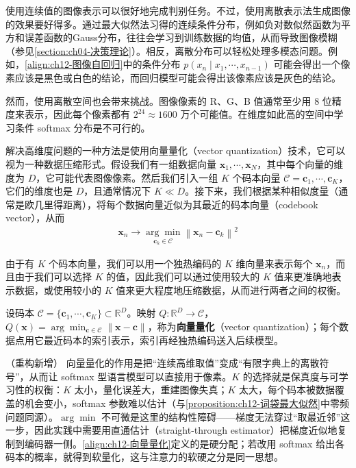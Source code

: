 \documentclass[../../main.tex]{subfiles}
\begin{document}
使用连续值的图像表示可以很好地完成判别任务。不过，使用离散表示法生成图像的效果要好得多。通过最大似然法习得的连续条件分布，例如负对数似然函数为平方和误差函数的Gauss分布，往往会学习到训练数据的均值，从而导致图像模糊（参见\cref{section:ch04-决策理论}）。相反，离散分布可以轻松处理多模态问题。例如，\eqref{align:ch12-图像自回归}中的条件分布 $p(x_n\mid x_1,\cdots,x_{n-1})$ 可能会得出一个像素应该是黑色或白色的结论，而回归模型可能会得出该像素应该是灰色的结论。

然而，使用离散空间也会带来挑战。图像像素的 R、G、B 值通常至少用 8 位精度来表示，因此每个像素都有 $2^{24}\approx1600$ 万个可能值。在维度如此高的空间中学习条件 softmax 分布是不可行的。

解决高维度问题的一种方法是使用向量量化（vector quantization）技术，它可以视为一种数据压缩形式。假设我们有一组数据向量 $\mathbf{x}_1,\cdots,\mathbf{x}_N$，其中每个向量的维度为 $D$，它可能代表图像像素。然后我们引入一组 $K$ 个码本向量 $\mathcal{C}=\mathbf{c}_1,\cdots,\mathbf{c}_K$，它们的维度也是 $D$，且通常情况下 $K\ll D$。接下来，我们根据某种相似度量（通常是欧几里得距离），将每个数据向量近似为其最近的码本向量（codebook vector），从而
\begin{align}
\mathbf{x}_n\to\underset{\mathbf{c}_k\in\mathcal{C}}{\arg\min}\left\|\mathbf{x}_n-\mathbf{c}_k\right\|^{2}
\label{align:ch12-向量量化}
\end{align}

由于有 $K$ 个码本向量，我们可以用一个独热编码的 $K$ 维向量来表示每个 $\mathbf{x}_n$，而且由于我们可以选择 $K$ 的值，因此我们可以通过使用较大的 $K$ 值来更准确地表示数据，或使用较小的 $K$ 值来更大程度地压缩数据，从而进行两者之间的权衡。

\begin{definition}[向量量化]\label{definition:ch12-向量量化}
设码本 $\mathcal{C}=\{\mathbf{c}_1,\cdots,\mathbf{c}_K\}\subset\mathbb{R}^{D}$。映射 $Q:\mathbb{R}^{D}\to\mathcal{C}$，$Q(\mathbf{x})=\arg\min_{\mathbf{c}\in\mathcal{C}}\|\mathbf{x}-\mathbf{c}\|$，称为\textbf{向量量化}（vector quantization）；每个数据点用它最近码本的索引表示，索引再经独热编码送入后续模型。
\end{definition}

\begin{remark}（重构新增）
向量量化的作用是把“连续高维取值”变成“有限字典上的离散符号”，从而让 softmax 型语言模型可以直接用于像素。$K$ 的选择就是保真度与可学习性的权衡：$K$ 太小，量化误差大，重建图像失真；$K$ 太大，每个码本被数据覆盖的机会变小，softmax 参数难以估计（与\cref{proposition:ch12-词袋最大似然}中零频问题同源）。$\arg\min$ 不可微是这里的结构性障碍——梯度无法穿过“取最近邻”这一步，因此实践中需要用直通估计（straight-through estimator）把梯度近似地复制到编码器一侧。\eqref{align:ch12-向量量化}定义的是硬分配；若改用 softmax 给出各码本的概率，就得到软量化，这与注意力的软硬之分是同一思想。
\end{remark}
\end{document}
